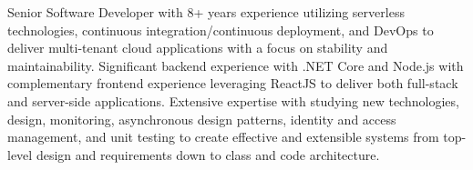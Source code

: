 \par{
    Senior Software Developer with 8+ years experience utilizing serverless technologies, continuous integration/continuous deployment, and DevOps to deliver multi-tenant cloud applications with a focus on stability and maintainability. Significant backend experience with .NET Core and Node.js with complementary frontend experience leveraging ReactJS to deliver both full-stack and server-side applications. Extensive expertise with studying new technologies, design, monitoring, asynchronous design patterns, identity and access management, and unit testing to create effective and extensible systems from top-level design and requirements down to class and code architecture.
}
